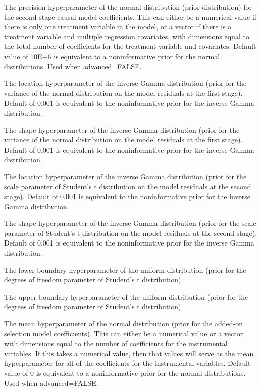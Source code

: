 \documentclass[a4paper]{book}
\begin{document}
\begin{Arguments}
\begin{ldescription}
\item[\code{G0}] The precision hyperparameter of the normal distribution (prior distribution)
for the second-stage causal model coefficients.
This can either be a numerical value if there is only one treatment variable in the model,
or a vector if there is a treatment variable and multiple regression covariates,
with dimensions equal to the total number of coefficients for the treatment variable and covariates.
Default value of 10E+6 is equivalent to a noninformative prior for the normal distributions.
Used when advanced=FALSE.

\item[\code{u0}] The location hyperparameter of the inverse Gamma distribution (prior for the variance of the
normal distribution on the model residuals at the first stage).
Default of 0.001 is equivalent to the noninformative prior for the inverse Gamma distribution.

\item[\code{U0}] The shape hyperparameter of the inverse Gamma distribution (prior for the variance of the
normal distribution on the model residuals at the first stage).
Default of 0.001 is equivalent to the noninformative prior for the inverse Gamma distribution.

\item[\code{e0}] The location hyperparameter of the inverse Gamma distribution (prior for the scale parameter
of Student's t distribution on the model residuals at the second stage).
Default of 0.001 is equivalent to the noninformative prior for the inverse Gamma distribution.

\item[\code{E0}] The shape hyperparameter of the inverse Gamma distribution (prior for the scale parameter
of Student's t distribution on the model residuals at the second stage).
Default of 0.001 is equivalent to the noninformative prior for the inverse Gamma distribution.

\item[\code{v0}] The lower boundary hyperparameter of the uniform distribution (prior for the degrees of freedom
parameter of Student's t distribution).

\item[\code{V0}] The upper boundary hyperparameter of the uniform distribution (prior for the degrees of freedom
parameter of Student's t distribution).

\item[\code{l0}] The mean hyperparameter of the normal distribution (prior for the added-on selection model coefficients).
This can either be a numerical value or a vector with dimensions equal to the number of coefficients for the instrumental variables.
If this takes a numerical value, then that values will serve as the mean hyperparameter for all of the coefficients
for the instrumental variables. Default value of 0 is equivalent to a noninformative prior for the normal distributions.
Used when advanced=FALSE.


\end{ldescription}
\end{Arguments}
\end{document}
